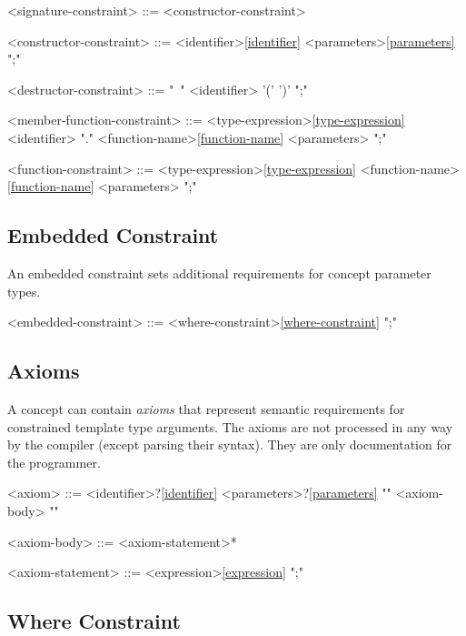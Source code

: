 \documentclass[a4paper,oneside,11pt]{article}
\begin{document}
\begin{grammar}
\label{signature-constraint}<signature-constraint> ::= <constructor-constraint>

<constructor-constraint> ::= <identifier>\ref{identifier} <parameters>\ref{parameters} ";"

<destructor-constraint> ::= "~" <identifier> '(' ')' ";"

<member-function-constraint> ::= <type-expression>\ref{type-expression}\\
<identifier> "." <function-name>\ref{function-name} <parameters> ";"

<function-constraint> ::= <type-expression>\ref{type-expression} <function-name>\ref{function-name} <parameters> ";"
\end{grammar}

\subsection{Embedded Constraint}

An embedded constraint sets additional requirements for concept parameter types.

\begin{grammar}
\label{embedded-constraint}<embedded-constraint> ::= <where-constraint>\ref{where-constraint} ";"
\end{grammar}

\subsection{Axioms}

A concept can contain \emph{axioms} that represent semantic requirements for constrained template type arguments.
The axioms are not processed in any way by the compiler (except parsing their syntax).
They are only documentation for the programmer.

\begin{grammar}
\label{axiom}<axiom> ::=  <identifier>?\ref{identifier} <parameters>?\ref{parameters} "{" <axiom-body> "}"

<axiom-body> ::= <axiom-statement>*

<axiom-statement> ::= <expression>\ref{expression} ";"
\end{grammar}

\subsection{Where Constraint}\label{sec:where-constraint}
\end{document}
